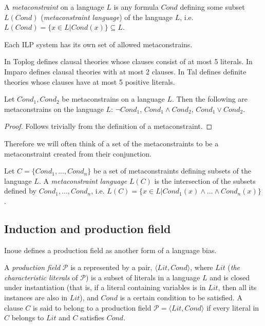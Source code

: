 \begin{defn}
A \emph{metaconstraint} on a language $L$ is any formula $Cond$ defining some subset $L(Cond)$ (\emph{metaconstraint language}) of the language $L$, i.e. $L(Cond)=\{x \in L | Cond(x)\}\subseteq L$.
\end{defn}

Each ILP system has its own set of allowed metaconstrains.
\begin{exmp}
In Toplog  defines clausal theories whose clauses consist of at most 5 literals.
In Imparo  defines clausal theories with at most 2 clauses.
In Tal  defines definite theories whose clauses have at most 5 positive literals.
\end{exmp}

\begin{proposition}
Let $Cond_1, Cond_2$ be metaconstrains on a language $L$.
Then the following are metaconstrains on the language $L$:
$\neg Cond_1$, $Cond_1 \land Cond_2$, $Cond_1 \lor Cond_2$.
\end{proposition}

\begin{proof}
Follows trivially from the definition of a metaconstraint.
\end{proof}

Therefore we will often think of a set of the metaconstraints to be a metaconstraint created from their conjunction.

\begin{defn}
Let $C=\{Cond_1, ..., Cond_n\}$ be a set of metaconstraints defining subsets of the language $L$.
A \emph{metaconstraint language} $L(C)$ is the intersection of the subsets defined by $Cond_1, ..., Cond_n$,
i.e. $L(C)=\{x \in L | Cond_1(x) \land ... \land Cond_n(x) \}$.
\end{defn}

\subsection{Induction and production field}
Inoue defines a production field as another form of a language bias.

\begin{defn}\cite{inoue2004induction}
A \emph{production field} $\mathcal{P}$ is a represented by a pair,
$\langle Lit, Cond\rangle$, where $Lit$
(\emph{the characteristic literals} of $\mathcal{P}$) is a subset of literals in a language $L$ and is closed under instantiation (that is, if a literal containing variables is in $Lit$, then all its instances are also in $Lit$), and $Cond$ is a certain condition to be satisfied. 
A clause $C$ is said to belong to a production field $\mathcal{P} = \langle Lit, Cond \rangle$ if every literal in $C$ belongs to $Lit$ and $C$ satisfies $Cond$.
\end{defn}

